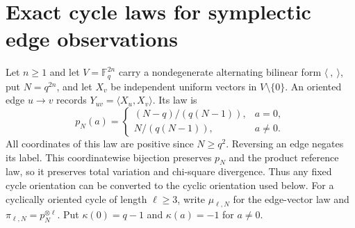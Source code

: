 \section{Exact cycle laws for symplectic edge observations}\label{sec:cycles}

Let $n\ge1$ and let $V=\mathbb F_q^{2n}$ carry a nondegenerate alternating bilinear form
$\langle\ ,\ \rangle$, put $N=q^{2n}$, and let $X_v$ be independent uniform
vectors in $V\setminus\{0\}$. An oriented edge $u\to v$ records
$Y_{uv}=\langle X_u,X_v\rangle$. Its law is
\[
 p_N(a)=\begin{cases}(N-q)/(q(N-1)),&a=0,\\
 N/(q(N-1)),&a\ne0.\end{cases}
\]
All coordinates of this law are positive since $N\ge q^2$.
Reversing an edge negates its label. This coordinatewise bijection preserves
$p_N$ and the product reference law, so it preserves total variation and
chi-square divergence. Thus any fixed cycle orientation can be converted
to the cyclic orientation used below.
For a cyclically oriented cycle of length $\ell\ge3$, write $\mu_{\ell,N}$
for the edge-vector law and $\pi_{\ell,N}=p_N^{\otimes\ell}$.
Put $\kappa(0)=q-1$ and $\kappa(a)=-1$ for $a\ne0$.

